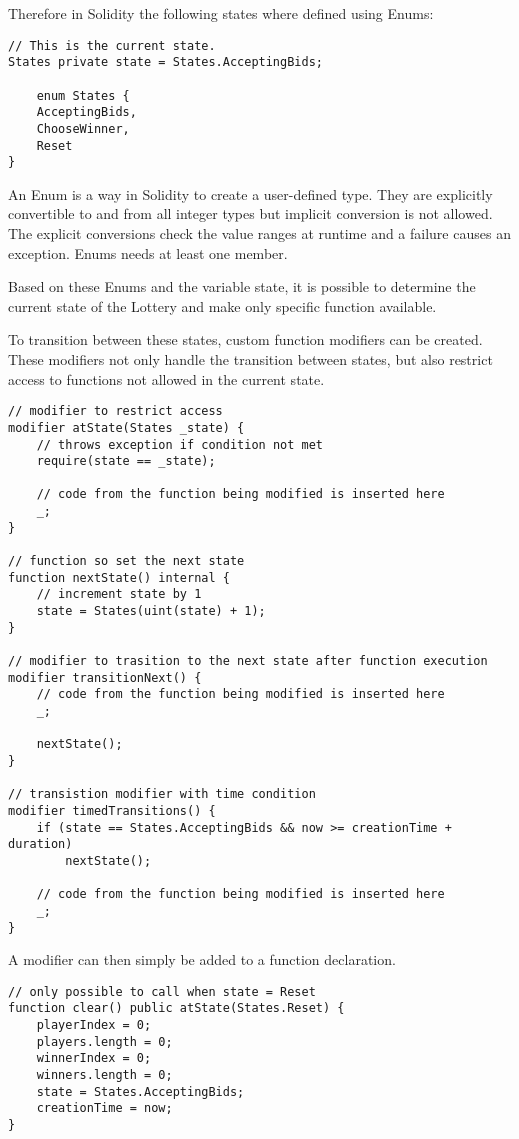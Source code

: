 Therefore in Solidity the following states where defined using Enums:

\begin{lstlisting}[language=Solidity]
// This is the current state.
States private state = States.AcceptingBids;

    enum States {
    AcceptingBids,
    ChooseWinner,
    Reset
}
\end{lstlisting}

An Enum is a way in Solidity to create a user-defined type. They are explicitly convertible to and from all integer types but implicit conversion is not allowed. The explicit conversions check the value ranges at runtime and a failure causes an exception. Enums needs at least one member.

Based on these Enums and the variable state, it is possible to determine the current state of the Lottery and make only specific function available.

To transition between these states, custom function modifiers can be created. These modifiers not only handle the transition between states, but also restrict access to functions not allowed in the current state.

\begin{lstlisting}[language=Solidity]
// modifier to restrict access
modifier atState(States _state) {
    // throws exception if condition not met
    require(state == _state);
    
    // code from the function being modified is inserted here
    _;
}

// function so set the next state
function nextState() internal {
    // increment state by 1
    state = States(uint(state) + 1);
}

// modifier to trasition to the next state after function execution
modifier transitionNext() {
    // code from the function being modified is inserted here
    _;
    
    nextState();
}

// transistion modifier with time condition
modifier timedTransitions() {
    if (state == States.AcceptingBids && now >= creationTime + duration)
        nextState();
        
    // code from the function being modified is inserted here
    _;
}
\end{lstlisting}

A modifier can then simply be added to a function declaration.

\begin{lstlisting}[language=Solidity]
// only possible to call when state = Reset
function clear() public atState(States.Reset) {
    playerIndex = 0;
    players.length = 0;
    winnerIndex = 0;
    winners.length = 0;
    state = States.AcceptingBids;
    creationTime = now;
}
\end{lstlisting}


